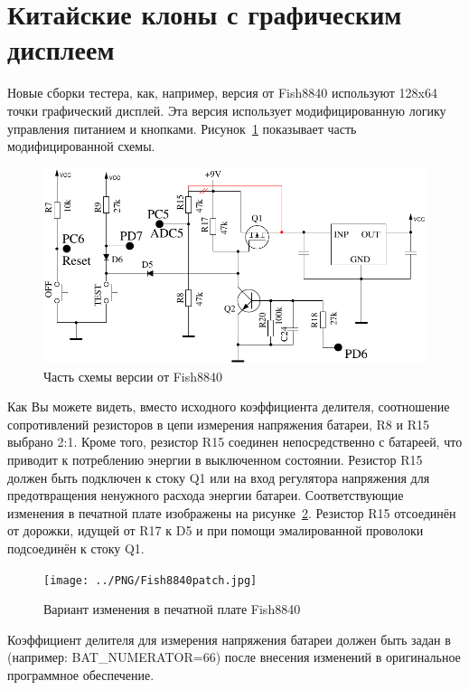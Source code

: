 \section{Китайские клоны с графическим дисплеем}
Новые сборки тестера, как, например, версия от Fish8840 используют 128x64 точки графический дисплей.
Эта версия использует модифицированную логику управления питанием и кнопками. 
Рисунок~\ref{fig:Fish8840} показывает часть модифицированной схемы.
\begin{figure}[H]
\centering
\includegraphics[width=.7\textwidth]{../FIG/Fish8840.pdf}
\caption{Часть схемы версии от Fish8840}
\label{fig:Fish8840}
\end{figure}
Как Вы можете видеть, вместо исходного коэффициента делителя, соотношение сопротивлений резисторов в цепи измерения 
напряжения батареи, R8 и R15 выбрано 2:1.
Кроме того, резистор R15 соединен непосредственно с батареей, что приводит к потреблению энергии в выключенном состоянии. 
Резистор R15 должен быть подключен к стоку Q1 или на вход регулятора напряжения для предотвращения ненужного 
расхода энергии батареи.
Соответствующие изменения в печатной плате изображены на рисунке~\ref{fig:Fish8840patch}.
Резистор R15 отсоединён от дорожки, идущей от R17 к D5 и при помощи эмалированной проволоки подсоединён к стоку Q1.
\begin{figure}[H]
\centering
\texttt{[image: ../PNG/Fish8840patch.jpg]}
\caption{Вариант изменения в печатной плате Fish8840}
\label{fig:Fish8840patch}
\end{figure}
Коэффициент делителя для измерения напряжения батареи должен быть задан в  (например: BAT\_NUMERATOR=66) 
после внесения изменений в оригинальное программное обеспечение.


